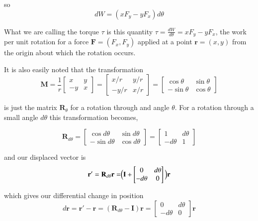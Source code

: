 \documentclass{article}      %
\newcommand{\D}[2] {\frac {d#2} {d#1}}
\newcommand{\Br}[0]{\mathbf{r}}
\newcommand{\BF}[0]{\mathbf{F}}
\newcommand{\BI}[0]{\mathbf{I}}
\newcommand{\BM}[0]{\mathbf{M}}
\newcommand{\BR}[0]{\mathbf{R}}
\newcommand{\inv}[1]{\frac{1}{#1}}
\begin{document}
so
\begin{equation*}
dW = (x F_y - y F_x) d\theta
\end{equation*}

What we are calling the torque $\tau$
is this quantity
$\tau = \D{\theta}{W} = x F_y - y F_x$,
the work per unit rotation for a force $\BF = (F_x, F_y)$
applied at a point $\Br = (x, y)$ from the origin about which the rotation occurs.

It is also easily noted that the transformation
\begin{equation*}
\BM =
\inv{r}
\begin{bmatrix}
 x & y \\
-y & x
\end{bmatrix}
=
\begin{bmatrix}
 x/r & y/r \\
-y/r & x/r
\end{bmatrix}
=
\begin{bmatrix}
 \cos\theta & \sin\theta \\
-\sin\theta & \cos\theta
\end{bmatrix}
\end{equation*}

is just the matrix $\BR_\theta$ for a rotation through and angle $\theta$.  For a rotation
through a small angle $d\theta$ this transformation becomes,

\begin{equation*}
\BR_{d\theta} =
\begin{bmatrix}
 \cos{d\theta} & \sin{d\theta} \\
-\sin{d\theta} & \cos{d\theta}
\end{bmatrix}
=
\begin{bmatrix}
 1 & d\theta \\
-d\theta & 1
\end{bmatrix}
\end{equation*}

and our displaced vector is
\begin{equation*}
\Br' = \BR_{d\theta} \Br =
\Bigr( \BI +
\begin{bmatrix}
 0 & d\theta \\
-d\theta & 0
\end{bmatrix}
\Bigl) \Br
\end{equation*}

which gives our differential change in position
\begin{equation*}
d\Br = \Br' - \Br =
(\BR_{d\theta}-\BI) \Br
=
\begin{bmatrix}
 0 & d\theta \\
-d\theta & 0
\end{bmatrix}
\Br
\end{equation*}
\end{document}
